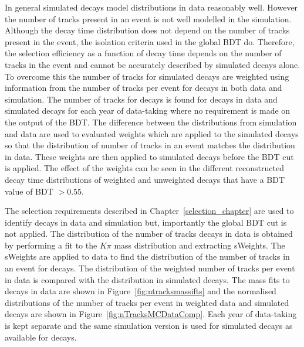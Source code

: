In general simulated decays model distributions in data reasonably well. However the number of tracks present in an event is not well modelled in the simulation. %
Although the \bsmumu decay time distribution does not depend on the number of tracks present in the event, the isolation criteria used in the global BDT do. Therefore, the selection efficiency as a function of decay time depends on the number of tracks in the event and cannot be accurately described by simulated decays alone. To overcome this the number of tracks for simulated \bsmumu decays are weighted using information from the number of tracks per event for \bdkpi decays in both data and simulation. The number of tracks for \bdkpi decays is found for decays in data and simulated decays for each year of data-taking where no requirement is made on the output of the BDT. The difference between the distributions from simulation and data are used to evaluated weights which are applied to the simulated decays so that the distribution of number of tracks in an event matches the distribution in data. These weights are then applied to simulated \bsmumu decays before the BDT cut is applied. The effect of the weights can be seen in the different reconstructed decay time distributions of weighted and unweighted decays that have a BDT value of BDT $>0.55$.

The selection requirements described in Chapter~\ref{selection_chapter} are used to identify \bdkpi decays in data and simulation but, importantly the global BDT cut is not applied. The distribution of the number of tracks \bdkpi decays in data is obtained by performing a fit to the $K\pi$ mass distribution and extracting sWeights. The sWeights are applied to data to find the distribution of the number of tracks in an event for \bdkpi decays. The distribution of the weighted number of tracks per event in data is compared with the distribution in simulated \bdkpi decays. The mass fits to \bdkpi decays in data are shown in Figure~\ref{fig:ntracksmassifts} and the normalised distributions of the number of tracks per event in weighted data and simulated decays are shown in Figure~\ref{fig:nTracksMCDataComp}. Each year of data-taking is kept separate and the same simulation version is used for \bdkpi simulated decays as available for \bsmumu decays.



